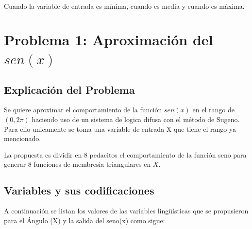 \documentclass[11pt, letterpaper]{article}
\begin{document}
Cuando la variable de entrada es mínima, cuando es media y cuando es máxima.

\newpage


\section{Problema 1: Aproximación del $sen(x)$}

\subsection{Explicación del Problema}

Se quiere aproximar el comportamiento de la función $sen(x)$ en el rango de $(0,2\pi)$ haciendo uso de un sistema de logica difusa con el método de Sugeno. Para ello unicamente se toma una variable de entrada X que tiene el rango ya mencionado.

La propuesta es dividir en 8 pedacitos el comportamiento de la función seno para generar 8 funciones de membresia triangulares en $X$. 





\subsection{Variables y sus codificaciones}

A continuación se listan los valores de las variables lingüísticas que se propusieron para el Ángulo (X) y la salida del seno(x) como sigue:
\end{document}
